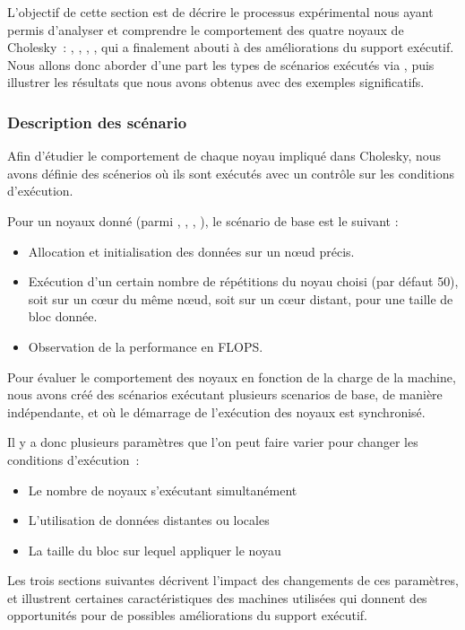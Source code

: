 L'objectif de cette section est de décrire le processus expérimental nous ayant permis d'analyser et comprendre le comportement des quatre noyaux de Cholesky~: \potrf, \trsm, \syrk, \gemm, qui a finalement abouti à des améliorations du support exécutif.
Nous allons donc aborder d'une part les types de scénarios exécutés via \outil, puis illustrer les résultats que nous avons obtenus avec des exemples significatifs.

\subsubsection{Description des scénario}

Afin d'étudier le comportement de chaque noyau impliqué dans Cholesky, nous avons définie des scénerios où ils sont exécutés avec un contrôle sur les conditions d'exécution.

Pour un noyaux donné (parmi \potrf, \trsm, \syrk, \gemm), le scénario de base est le suivant :
\begin{itemize}
  \item Allocation et initialisation des données sur un nœud précis.
  \item Exécution d'un certain nombre de répétitions du noyau choisi (par défaut 50), soit sur un cœur du même nœud, soit sur un cœur distant, pour une taille de bloc donnée.
  \item Observation de la performance en FLOPS.
\end{itemize}

Pour évaluer le comportement des noyaux en fonction de la charge de la machine, nous avons créé des scénarios exécutant plusieurs scenarios de base, de manière indépendante, et où le démarrage de l'exécution des noyaux est synchronisé.

Il y a donc plusieurs paramètres que l'on peut faire varier pour changer les conditions d'exécution~:
\begin{itemize}
  \item Le nombre de noyaux s'exécutant simultanément
  \item L'utilisation de données distantes ou locales
  \item La taille du bloc sur lequel appliquer le noyau
\end{itemize}

Les trois sections suivantes décrivent l'impact des changements de ces paramètres, et illustrent certaines caractéristiques des machines utilisées qui donnent des opportunités pour de possibles améliorations du support exécutif.

